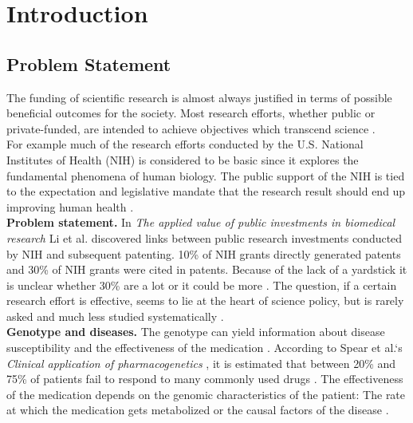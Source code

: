 \chapter{Introduction}
\label{cha:intro}

\section{Problem Statement}

The funding of scientific research is almost always justified in terms of possible beneficial outcomes for the society. Most research efforts, whether public or private-funded, are intended to achieve objectives which transcend science \cite{Sarewitz2007TheNH}. \\

For example much of the research efforts conducted by the U.S. National Institutes of Health (NIH) is considered to be basic since it explores the fundamental phenomena of human biology. The public support of the NIH is tied to the expectation and legislative mandate that the research result should end up improving human health \cite{Sarewitz2007TheNH}. \\

\textbf{Problem statement.} In \textit{The applied value of public investments in biomedical research}\cite{Li2017TheAV} Li et al. discovered links between public research investments conducted by NIH and subsequent patenting. 10\% of NIH grants directly generated patents and 30\% of NIH grants were cited in patents. Because of the lack of a yardstick it is unclear whether 30\% are a lot or it could be more \cite{Li2017TheAV}. The question, if a certain research effort is effective, seems to lie at the heart of science policy, but is rarely asked and much less studied systematically \cite{Sarewitz2007TheNH}. \\

\textbf{Genotype and diseases.} The genotype can yield information about disease susceptibility and the effectiveness of the medication \cite{Brunicardi2011OverviewOT}. According to Spear et al.`s \textit{Clinical application of pharmacogenetics} \cite{Spear2001ClinicalAO}, it is estimated that between 20\% and 75\% of patients fail to respond to many commonly used drugs \cite{Spear2001ClinicalAO}. The effectiveness of the medication depends on the genomic characteristics of the patient: The rate at which the medication gets metabolized or the causal factors of the disease \cite{Brunicardi2011OverviewOT}. \\

